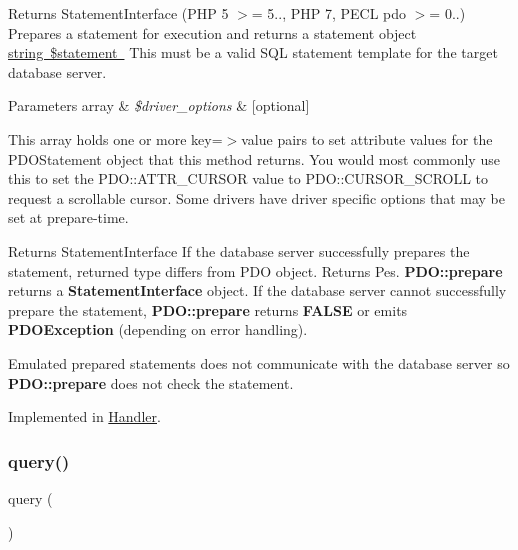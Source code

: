 \begin{DoxyReturn}{Returns}
Statement\+Interface (P\+HP 5 $>$= 5.., P\+HP 7, P\+E\+CL pdo $>$= 0..)~\newline
 Prepares a statement for execution and returns a statement object \mbox{\hyperlink{}{string \$statement }} This must be a valid S\+QL statement template for the target database server. 
\end{DoxyReturn}

\begin{DoxyParams}[1]{Parameters}
array & {\em \$driver\+\_\+options} & \mbox{[}optional\mbox{]} \\
\hline
\end{DoxyParams}
This array holds one or more key=$>$value pairs to set attribute values for the P\+D\+O\+Statement object that this method returns. You would most commonly use this to set the P\+D\+O\+::\+A\+T\+T\+R\+\_\+\+C\+U\+R\+S\+OR value to P\+D\+O\+::\+C\+U\+R\+S\+O\+R\+\_\+\+S\+C\+R\+O\+LL to request a scrollable cursor. Some drivers have driver specific options that may be set at prepare-\/time. 

\begin{DoxyReturn}{Returns}
Statement\+Interface If the database server successfully prepares the statement, returned type differs from P\+DO object. Returns Pes. {\bfseries P\+D\+O\+::prepare} returns a {\bfseries Statement\+Interface} object. If the database server cannot successfully prepare the statement, {\bfseries P\+D\+O\+::prepare} returns {\bfseries F\+A\+L\+SE} or emits {\bfseries P\+D\+O\+Exception} (depending on error handling). 
\end{DoxyReturn}


Emulated prepared statements does not communicate with the database server so {\bfseries P\+D\+O\+::prepare} does not check the statement. 

Implemented in \mbox{\hyperlink{class_pes_1_1_database_1_1_handler_1_1_handler_a813f4f79dd359e1e6f4f45263868a8f4}{Handler}}.

\mbox{\label{interface_pes_1_1_database_1_1_handler_1_1_p_d_o_interface_a8dbd35d765e8ff0d1c34461ef67c5abf}} 
\subsubsection{\texorpdfstring{query()}{query()}}
{\footnotesize\ttfamily query (\begin{DoxyParamCaption}{ }\end{DoxyParamCaption})}

